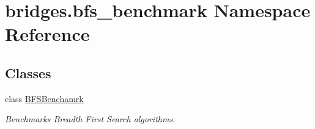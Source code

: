 \hypertarget{namespacebridges_1_1bfs__benchmark}{}\section{bridges.\+bfs\+\_\+benchmark Namespace Reference}
\label{namespacebridges_1_1bfs__benchmark}
\subsection*{Classes}
\begin{DoxyCompactItemize}
\item 
class \hyperlink{classbridges_1_1bfs__benchmark_1_1_b_f_s_benchamrk}{B\+F\+S\+Benchamrk}
\begin{DoxyCompactList}\small\item\em Benchmarks Breadth First Search algorithms. \end{DoxyCompactList}\end{DoxyCompactItemize}
